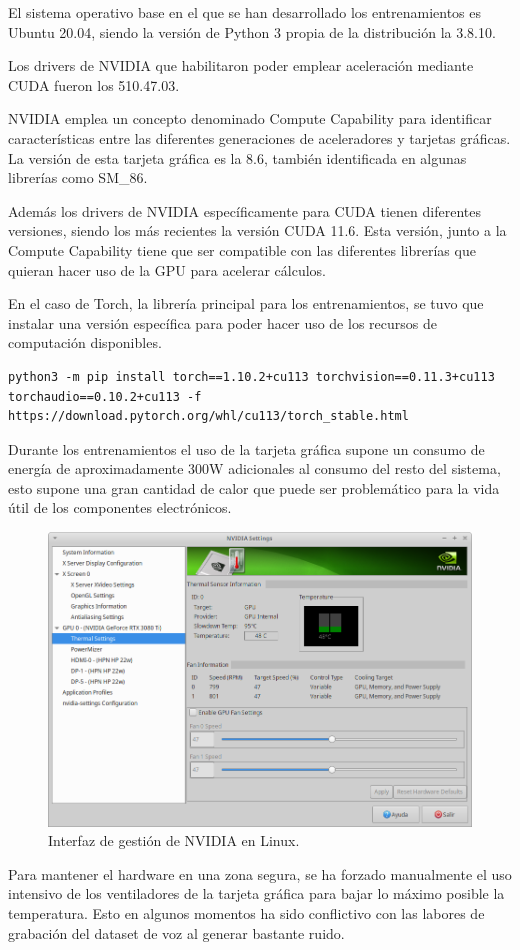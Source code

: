 El sistema operativo base en el que se han desarrollado los entrenamientos es Ubuntu 20.04, siendo la versión de Python 3 propia de la distribución la 3.8.10.

Los drivers de NVIDIA que habilitaron poder emplear aceleración mediante CUDA fueron los 510.47.03. 

NVIDIA emplea un concepto denominado Compute Capability para identificar características entre las diferentes generaciones de aceleradores y tarjetas gráficas. La versión de esta tarjeta gráfica es la 8.6, también identificada en algunas librerías como SM\_86.

Además los drivers de NVIDIA específicamente para CUDA tienen diferentes versiones, siendo los más recientes la versión CUDA 11.6. Esta versión, junto a la Compute Capability tiene que ser compatible con las diferentes librerías que quieran hacer uso de la GPU para acelerar cálculos.

En el caso de Torch, la librería principal para los entrenamientos, se tuvo que instalar una versión específica para poder hacer uso de los recursos de computación disponibles.

\begin{lstlisting}
python3 -m pip install torch==1.10.2+cu113 torchvision==0.11.3+cu113 torchaudio==0.10.2+cu113 -f https://download.pytorch.org/whl/cu113/torch_stable.html
\end{lstlisting}

Durante los entrenamientos el uso de la tarjeta gráfica supone un consumo de energía de aproximadamente 300W adicionales al consumo del resto del sistema, esto supone una gran cantidad de calor que puede ser problemático para la vida útil de los componentes electrónicos.

\begin{figure}[H]
\centering
\includegraphics[width=14cm]{Z_anexos_img/nvidia-smi.png}
\caption{Interfaz de gestión de NVIDIA en Linux.}
\label{fig:figure1}
\end{figure}

Para mantener el hardware en una zona segura, se ha forzado manualmente el uso intensivo de los ventiladores de la tarjeta gráfica para bajar lo máximo posible la temperatura. Esto en algunos momentos ha sido conflictivo con las labores de grabación del dataset de voz al generar bastante ruido.